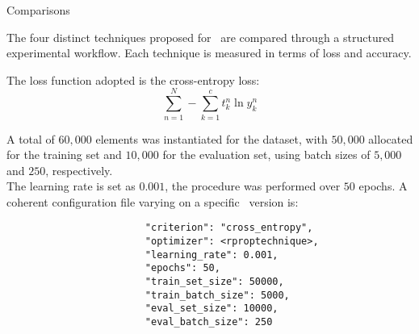 \begin{section}{Comparisons}
    \par The four distinct techniques proposed for~ are compared through a structured experimental workflow. Each technique is measured in terms of loss and accuracy.
    \par The loss function adopted is the cross-entropy loss:
    \[
        \sum_{n=1}^{N} - \sum_{k=1}^{c} t_{k}^{n} \ln y_{k}^{n}
    \]
    \par A total of $60,000$ elements was instantiated for the dataset, with $50,000$ allocated for the training set and $10,000$ for the evaluation set, using batch sizes of $5,000$ and $250$, respectively.\\
    The learning rate is set as $0.001$, the procedure was performed over $50$ epochs. A coherent configuration file varying on a specific~ version is:\\
    \begin{verbatim}
                        "criterion": "cross_entropy",
                        "optimizer": <rproptechnique>,
                        "learning_rate": 0.001,
                        "epochs": 50,
                        "train_set_size": 50000,
                        "train_batch_size": 5000,
                        "eval_set_size": 10000,
                        "eval_batch_size": 250
    \end{verbatim}
    \clearpage
    
    
\end{section}